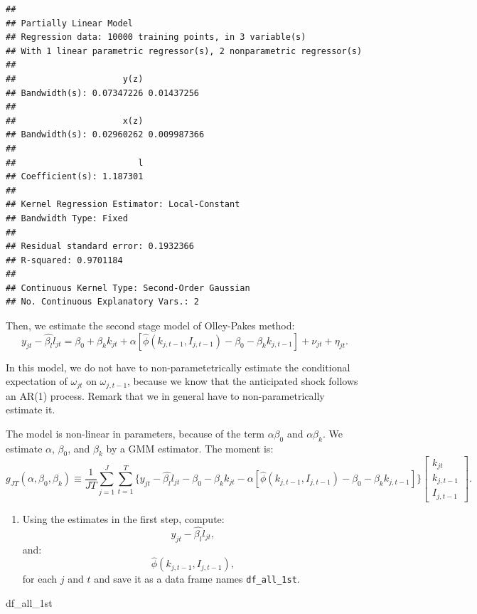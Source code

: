 \documentclass[
]{book}
\newenvironment{Shaded}{\begin{snugshade}}{\end{snugshade}}
\newcommand{\NormalTok}[1]{#1}
\providecommand{\tightlist}{%
  \setlength{\itemsep}{0pt}\setlength{\parskip}{0pt}}
\begin{document}
\begin{verbatim}
## 
## Partially Linear Model
## Regression data: 10000 training points, in 3 variable(s)
## With 1 linear parametric regressor(s), 2 nonparametric regressor(s)
## 
##                     y(z)           
## Bandwidth(s): 0.07347226 0.01437256
## 
##                     x(z)            
## Bandwidth(s): 0.02960262 0.009987366
## 
##                        l
## Coefficient(s): 1.187301
## 
## Kernel Regression Estimator: Local-Constant
## Bandwidth Type: Fixed
## 
## Residual standard error: 0.1932366
## R-squared: 0.9701184
## 
## Continuous Kernel Type: Second-Order Gaussian
## No. Continuous Explanatory Vars.: 2
\end{verbatim}

Then, we estimate the second stage model of Olley-Pakes method:
\[
y_{jt} - \hat{\beta_l} l_{jt} = \beta_0 + \beta_k k_{jt} + \alpha[\hat{\phi}(k_{j, t - 1}, I_{j, t - 1}) - \beta_0 - \beta_k k_{j, t-1}] + \nu_{jt} + \eta_{jt}.
\]

In this model, we do not have to non-parametetrically estimate the conditional expectation of \(\omega_{jt}\) on \(\omega_{j, t - 1}\), because we know that the anticipated shock follows an AR(1) process. Remark that we in general have to non-parametrically estimate it.

The model is non-linear in parameters, because of the term \(\alpha \beta_0\) and \(\alpha \beta_k\). We estimate \(\alpha\), \(\beta_0\), and \(\beta_k\) by a GMM estimator. The moment is:
\[
g_{JT}(\alpha, \beta_0, \beta_k) \equiv \frac{1}{JT}\sum_{j = 1}^J \sum_{t = 1}^T \{y_{jt} - \hat{\beta_l} l_{jt} - \beta_0 - \beta_k k_{jt} - \alpha[\hat{\phi}(k_{j, t - 1}, I_{j, t - 1}) - \beta_0 - \beta_k k_{j, t-1}]\} 
\begin{bmatrix}
k_{jt} \\
k_{j, t - 1} \\
I_{j, t - 1}
\end{bmatrix}.
\]

\begin{enumerate}
\def\labelenumi{\arabic{enumi}.}
\setcounter{enumi}{4}
\tightlist
\item
  Using the estimates in the first step, compute:
  \[
  y_{jt} - \hat{\beta_l} l_{jt},
  \]
  and:
  \[
  \hat{\phi}(k_{j, t - 1}, I_{j, t - 1}),
  \]
  for each \(j\) and \(t\) and save it as a data frame names \texttt{df\_all\_1st}.
\end{enumerate}

\begin{Shaded}
\begin{Highlighting}[]
\NormalTok{df\_all\_1st}
\end{Highlighting}
\end{Shaded}
\end{document}
